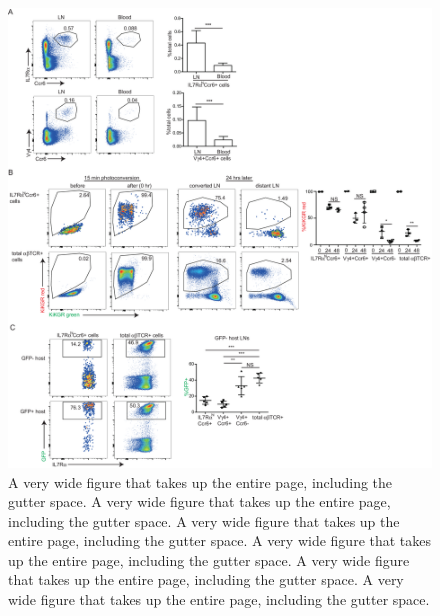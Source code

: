 \documentclass[9pt,lineno]{elife}
\begin{document}
\begin{figure}
\begin{fullwidth}
\includegraphics[width=0.95\linewidth]{elife-18156-fig2}
\caption{A very wide figure that takes up the entire page, including the gutter space. A very wide figure that takes up the entire page, including the gutter space. A very wide figure that takes up the entire page, including the gutter space. A very wide figure that takes up the entire page, including the gutter space. A very wide figure that takes up the entire page, including the gutter space. A very wide figure that takes up the entire page, including the gutter space.}
\label{fig:fullwidth}
\end{fullwidth}
\end{figure}
\end{document}
